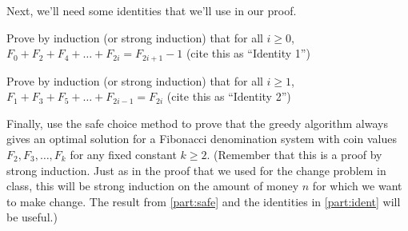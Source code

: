 \documentclass{ks-pset}
\begin{document}
\begin{problem}
\begin{subproblems}
    \item \label{part:ident} Next, we'll need some identities that we'll use in
      our proof.
      \begin{subproblems}
        \item Prove by induction (or strong induction) that for all $i ≥ 0$,
          $F_0 + F_2 + F_4 + \dots + F_{2i} = F_{2i+1} - 1$ (cite this as
          ``Identity 1'')
        \item Prove by induction (or strong induction) that for all $i ≥ 1$,
          $F_1+ F_3 + F_5 + \dots + F_{2i-1} = F_{2i}$ (cite this as ``Identity
          2'')
      \end{subproblems}
    \item Finally, use the safe choice method  to prove that the greedy
      algorithm always gives an optimal solution for a Fibonacci denomination
      system with coin values $F_2, F_3, \dots, F_k$ for any fixed constant $k
      ≥ 2$.  (Remember that this is a proof by strong induction.  Just as in
      the proof that we used for the change problem in class, this will be
      strong induction on the amount of money $n$ for which we want to make
      change.  The result from \cref{part:safe} and the identities in
      \cref{part:ident} will be useful.)
  \end{subproblems}

\end{problem}

\begin{solution}
\end{solution}
\end{document}

